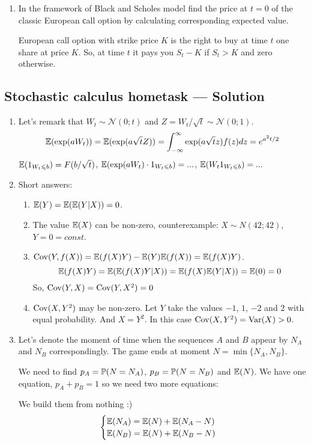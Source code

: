 \documentclass[12pt, a4paper]{article}
\newcommand{\cN}{\mathcal{N}}
\begin{document}
\begin{enumerate}
\item In the framework of Black and Scholes model find the price at $t=0$ of the classic European сall option by calculating corresponding expected value.

European call option with strike price $K$ is the right to buy at time $t$ one share at price $K$. So, at time $t$ it pays you $S_t - K$ if $S_t > K$ and zero otherwise.

\end{enumerate}




\subsection{Stochastic calculus hometask — Solution}

\begin{enumerate}

\item Let's remark that $W_t \sim \cN(0;t)$ and $Z=W_t/\sqrt{t} \sim \cN(0;1)$.
\[
\E(\exp(aW_t))=\E(\exp(a\sqrt{t} Z))=
\int_{-\infty}^{\infty}\exp(a\sqrt{t} z)f(z)dz =
e^{a^2t/2}
\]
$\E(1_{W_t\leq b})=F(b/\sqrt{t})$, $\E(\exp(aW_t)\cdot 1_{W_t\leq b})=...$, $\E(W_t 1_{W_t\leq b})=...$
\item Short answers:

\begin{enumerate}
\item $\E(Y)=\E(\E(Y|X))=0$.
\item The value $\E(X)$ can be non-zero, counterexample: $X\sim N(42; 42)$, $Y=0=const$.
\item $\Cov(Y, f(X)) = \E(f(X)Y) - \E(Y)\E(f(X))=\E(f(X)Y)$.
\[
\E(f(X)Y)= \E(\E(f(X)Y|X))=\E(f(X)\E(Y|X))=\E(0)=0
\]
So, $\Cov(Y,X)=\Cov(Y,X^2)=0$
\item $\Cov(X, Y^2)$ may be non-zero. Let $Y$ take the values $-1$, $1$, $-2$ and $2$ with equal probability. And $X=Y^2$. In this case $\Cov(X, Y^2)=\Var(X)>0$.
\end{enumerate}

\item Let's denote the moment of time when the sequences $A$ and $B$ appear by $N_A$ and $N_B$ correspondingly. The game ends at moment $N=\min \{N_A, N_B\}$.

We need to find $p_A = \P(N=N_A)$, $p_B=\P(N=N_B)$ and $\E(N)$. We have one equation, $p_A + p_B = 1$ so we need two more equations:

We build them from nothing :)
\[
\begin{cases}
\E(N_A) = \E(N) + \E(N_A - N) \\
\E(N_B) = \E(N) + \E(N_B - N) \\
\end{cases}
\]


\end{enumerate}
\end{document}
